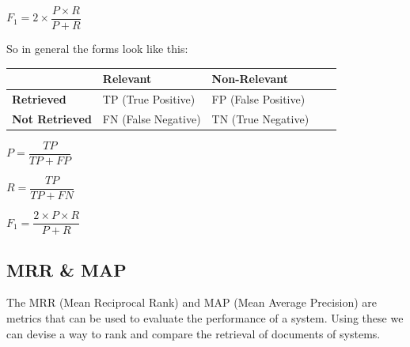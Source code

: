 \documentclass[
../../NLP4W_Summary.tex,
]
{subfiles}
\begin{document}
\begin{center}
    \begin{smallmathbox*}
        $F_1 = 2 \times \dfrac{P \times R}{P + R}$
    \end{smallmathbox*}
\end{center}

So in general the forms look like this:
\begin{table}[htp]
    \centering
    \begin{tabular}{|l|l|l|l|l|}
        \hline
        & \textbf{Relevant} & \textbf{Non-Relevant} \\ \hline
        \textbf{Retrieved} & TP (True Positive) & FP (False Positive) \\ \hline
        \textbf{Not Retrieved} & FN (False Negative) & TN (True Negative) \\ \hline
    \end{tabular}
\end{table}

\begin{minipage}
    [t]{0.3\textwidth}
    \begin{center}
        \begin{smallmathbox}
            [Precision]
            $P = \dfrac{TP}{TP + FP}$
        \end{smallmathbox}
    \end{center}
\end{minipage}
\hfill
\begin{minipage}
    [t]{0.3\textwidth}
    \begin{center}
        \begin{smallmathbox}
            [Recall]
            $R = \dfrac{TP}{TP + FN}$
        \end{smallmathbox}
    \end{center}
\end{minipage}
\hfill
\begin{minipage}
    [t]{0.3\textwidth}
    \begin{center}
        \begin{smallmathbox}
            [F-Score]
            $F_1 = \dfrac{2 \times P \times R}{P + R}$
        \end{smallmathbox}
    \end{center}
\end{minipage}

\newpage
\subsection{MRR \& MAP}
The MRR (Mean Reciprocal Rank) and MAP (Mean Average Precision) are metrics that can be used to evaluate the performance of a system. Using these we can devise a way to rank and compare the retrieval of documents of systems. 
\end{document}
